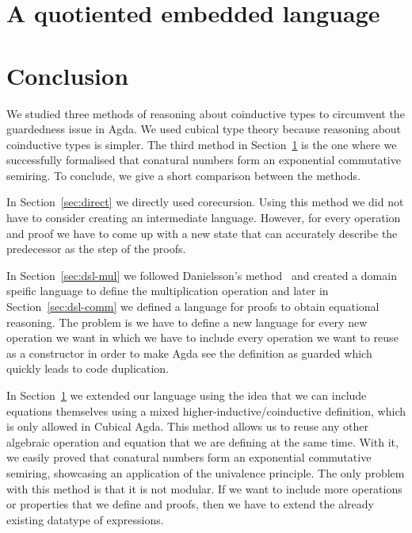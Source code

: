 \documentclass[sigplan, screen, natbib=false, review]{acmart}
\begin{document}

\section{A quotiented embedded language}\label{sec:quotiented}



\section{Conclusion}

We studied three methods of reasoning about coinductive types to circumvent the
guardedness issue in Agda. We used cubical type theory because reasoning about
coinductive types is simpler. The third method in Section~\ref{sec:quotiented}
is the one where we successfully formalised that conatural numbers form an
exponential commutative semiring. To conclude, we give a short comparison
between the methods.

In Section~\ref{sec:direct} we directly used corecursion. Using this method we
did not have to consider creating an intermediate language. However, for every
operation and proof we have to come up with a new state that can accurately
describe the predecessor as the step of the proofs.

In Section~\ref{sec:dsl-mul} we followed Danielsson's
method~\cite{danielsson-beating} and created a domain speific language to define
the multiplication operation and later in Section~\ref{sec:dsl-comm} we defined
a language for proofs to obtain equational reasoning. The problem is we have to
define a new language for every new operation we want in which we have to
include every operation we want to reuse as a constructor in order to make Agda
see the definition as guarded which quickly leads to code duplication.

In Section~\ref{sec:quotiented} we extended our language using the idea that we
can include equations themselves using a mixed higher-inductive/coinductive
definition, which is only allowed in Cubical Agda. This method allows us to
reuse any other algebraic operation and equation that we are defining at the
same time. With it, we easily proved that conatural numbers form an exponential
commutative semiring, showcasing an application of the univalence principle. The
only problem with this method is that it is not modular. If we want to include
more operations or properties that we define and proofs, then we have to extend
the already existing datatype of expressions.
\end{document}
